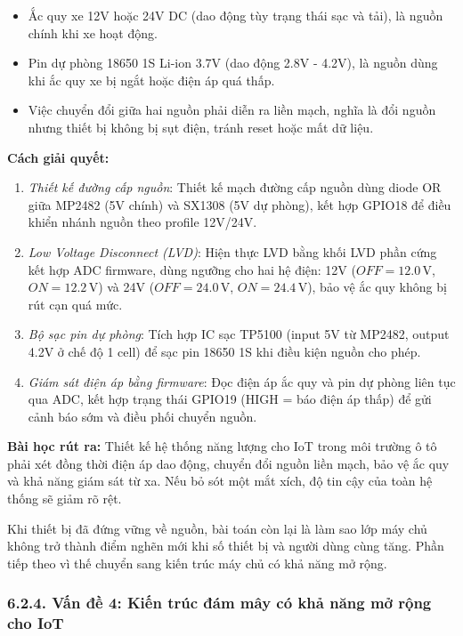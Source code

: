 \documentclass[a4paper]{extarticle}
\providecommand{\tightlist}{%
  \setlength{\itemsep}{0pt}\setlength{\parskip}{0pt}}
\begin{document}
\begin{itemize}
\tightlist
\item
  Ắc quy xe 12V hoặc 24V DC (dao động tùy trạng thái sạc và tải), là
  nguồn chính khi xe hoạt động.
\item
  Pin dự phòng 18650 1S Li-ion 3.7V (dao động 2.8V - 4.2V), là nguồn
  dùng khi ắc quy xe bị ngắt hoặc điện áp quá thấp.
\item
  Việc chuyển đổi giữa hai nguồn phải diễn ra liền mạch, nghĩa là đổi
  nguồn nhưng thiết bị không bị sụt điện, tránh reset hoặc mất dữ
  liệu.
\end{itemize}

\textbf{Cách giải quyết:}

\begin{enumerate}
\def\labelenumi{\arabic{enumi}.}
\tightlist
\item
  \emph{Thiết kế đường cấp nguồn}: Thiết kế mạch đường cấp nguồn dùng diode OR
  giữa MP2482 (5V chính) và SX1308 (5V dự phòng), kết hợp GPIO18 để điều
  khiển nhánh nguồn theo profile 12V/24V.
\item
  \emph{Low Voltage Disconnect (LVD)}: Hiện thực LVD bằng khối LVD phần
  cứng kết hợp ADC firmware, dùng ngưỡng cho hai hệ điện:
  12V (\(OFF = 12.0\,\mathrm{V}\), \(ON = 12.2\,\mathrm{V}\)) và
  24V (\(OFF = 24.0\,\mathrm{V}\), \(ON = 24.4\,\mathrm{V}\)),
  bảo vệ ắc quy không bị rút cạn
  quá mức.
\item
  \emph{Bộ sạc pin dự phòng}: Tích hợp IC sạc TP5100 (input 5V từ
  MP2482, output 4.2V ở chế độ 1 cell) để sạc pin 18650 1S khi điều kiện
  nguồn cho phép.
\item
  \emph{Giám sát điện áp bằng firmware}: Đọc điện áp ắc quy và pin dự
  phòng liên tục qua ADC, kết hợp trạng thái GPIO19 (HIGH = báo điện áp thấp)
  để gửi cảnh báo sớm và điều phối chuyển nguồn.
\end{enumerate}

\textbf{Bài học rút ra:} Thiết kế hệ thống năng lượng cho IoT trong môi
trường ô tô phải xét đồng thời điện áp dao động, chuyển đổi nguồn liền
mạch, bảo vệ ắc quy và khả năng giám sát từ xa. Nếu bỏ sót một mắt xích,
độ tin cậy của toàn hệ thống sẽ giảm rõ rệt.

Khi thiết bị đã đứng vững về nguồn, bài toán còn lại là làm sao lớp máy
chủ không trở thành điểm nghẽn mới khi số thiết bị và người dùng cùng
tăng. Phần tiếp theo vì thế chuyển sang kiến trúc máy chủ có khả năng mở
rộng.

\subsubsection{6.2.4. Vấn đề 4: Kiến trúc đám mây có khả năng mở rộng
cho
IoT}\label{624-vux1ea5n-ux111ux1ec1-4-kiux1ebfn-truxfac-ux111uxe1m-muxe2y-cuxf3-khux1ea3-nux103ng-mux1edf-rux1ed9ng-cho-iot}
\end{document}
